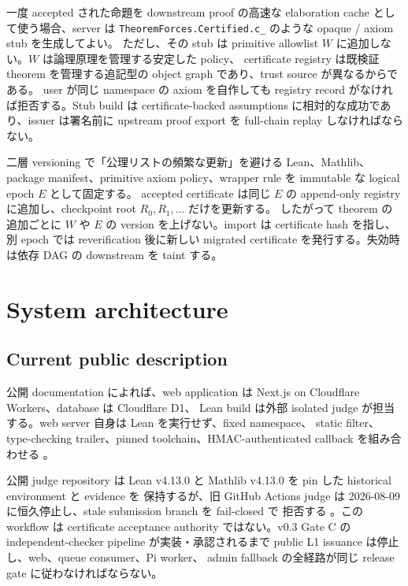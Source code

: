 \documentclass[a4paper,11pt]{ltjsarticle}
\begin{document}
一度 accepted された命題を downstream proof の高速な elaboration cache として使う場合、server は
\texttt{TheoremForces.Certified.c\_<certificate-hash>} のような opaque / axiom stub を生成してよい。
ただし、その stub は primitive allowlist $W$ に追加しない。$W$ は論理原理を管理する安定した policy、
certificate registry は既検証 theorem を管理する追記型の object graph であり、trust source が異なるからである。
user が同じ namespace の axiom を自作しても registry record がなければ拒否する。Stub build は
certificate-backed assumptions に相対的な成功であり、issuer は署名前に upstream proof export を full-chain replay
しなければならない。

\begin{decisionbox}{二層 versioning で「公理リストの頻繁な更新」を避ける}
Lean、Mathlib、package manifest、primitive axiom policy、wrapper rule を immutable な logical epoch $E$ として固定する。
accepted certificate は同じ $E$ の append-only registry に追加し、checkpoint root $R_0,R_1,\ldots$ だけを更新する。
したがって theorem の追加ごとに $W$ や $E$ の version を上げない。import は certificate hash を指し、別 epoch では
reverification 後に新しい migrated certificate を発行する。失効時は依存 DAG の downstream を taint する。
\end{decisionbox}

\section{System architecture}

\subsection{Current public description}

公開 documentation によれば、web application は Next.js on Cloudflare Workers、database は Cloudflare D1、
Lean build は外部 isolated judge が担当する。web server 自身は Lean を実行せず、fixed namespace、
static filter、type-checking trailer、pinned toolchain、HMAC-authenticated callback を組み合わせる
\cite{tfabout,tfjudging,tfsecurity}。

公開 judge repository は Lean v4.13.0 と Mathlib v4.13.0 を pin した historical environment と evidence を
保持するが、旧 GitHub Actions judge は 2026-08-09 に恒久停止し、stale submission branch を fail-closed で
拒否する \cite{tfrepo}。この workflow は certificate acceptance authority ではない。v0.3 Gate C の
independent-checker pipeline が実装・承認されるまで public L1 issuance は停止し、web、queue consumer、Pi worker、
admin fallback の全経路が同じ release gate に従わなければならない。
\end{document}
